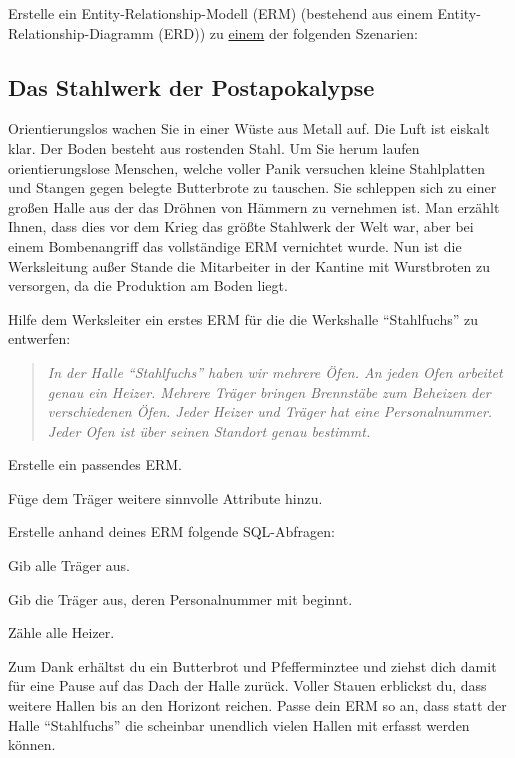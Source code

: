 \documentclass[11pt, a4paper, ngerman]{arbeitsblatt}
\begin{document}
\ReiheTitel

\begin{aufgabe}
Erstelle ein Entity-Relationship-Modell (ERM) (bestehend aus einem Entity-Relationship-Diagramm
(ERD)) zu \underline{einem} der folgenden Szenarien:

\begin{rahmen}\vspace*{-1em}
\subsection*{Das Stahlwerk der Postapokalypse}

Orientierungslos wachen Sie in einer Wüste aus Metall auf. Die Luft ist eiskalt klar.
Der Boden besteht aus rostenden Stahl. Um Sie herum laufen orientierungslose Menschen,
welche voller Panik versuchen kleine Stahlplatten und Stangen gegen belegte Butterbrote
zu tauschen. Sie schleppen sich zu einer großen Halle aus der das Dröhnen von Hämmern zu
vernehmen ist. Man erzählt Ihnen, dass dies vor dem Krieg das größte Stahlwerk der Welt
war, aber bei einem Bombenangriff das vollständige ERM vernichtet wurde. Nun ist die
Werksleitung außer Stande die Mitarbeiter in der Kantine mit Wurstbroten zu versorgen,
da die Produktion am Boden liegt.

Hilfe dem Werksleiter ein erstes ERM für die die Werkshalle \enquote{Stahlfuchs} zu entwerfen:

\begin{quote}\itshape
	In der Halle \enquote{Stahlfuchs} haben wir mehrere Öfen. An jeden Ofen arbeitet genau ein
	Heizer. Mehrere Träger bringen Brennstäbe zum Beheizen der verschiedenen Öfen. Jeder
	Heizer und Träger hat eine Personalnummer. Jeder Ofen ist über seinen Standort genau
	bestimmt.
\end{quote}

\begin{enuma}[noitemsep]
	\item Erstelle ein passendes ERM.
	\item Füge dem Träger weitere sinnvolle Attribute hinzu.
	\item Erstelle anhand deines ERM folgende SQL-Abfragen:
	\begin{smallenum}
		\item Gib alle Träger aus.
		\item Gib die Träger aus, deren Personalnummer mit  beginnt.
		\item Zähle alle Heizer.
	\end{smallenum}
	\smallskip
	\item Zum Dank erhältst du ein Butterbrot und Pfefferminztee und ziehst dich damit für
	eine Pause auf das Dach der Halle zurück. Voller Stauen erblickst du, dass weitere Hallen
	bis an den Horizont reichen. Passe dein ERM so an, dass statt der Halle \enquote{Stahlfuchs}
	die scheinbar unendlich vielen Hallen mit erfasst werden können.
\end{enuma}
\end{rahmen}


\end{aufgabe}
\end{document}
